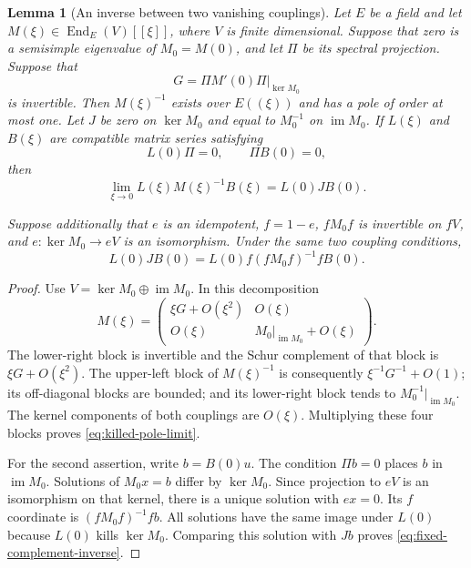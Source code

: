 \documentclass[11pt]{article}
\newtheorem{lemma}[theorem]{Lemma}
\theoremstyle{definition}
\theoremstyle{remark}
\numberwithin{equation}{section}
\begin{document}
\begin{lemma}[An inverse between two vanishing couplings]
\label{lem:killed-pole}
Let $E$ be a field and let $M(\xi)\in\operatorname{End}_E(V)[[\xi]]$, where
$V$ is finite dimensional.  Suppose that zero is a semisimple eigenvalue of
$M_0=M(0)$, and let $\Pi$ be its spectral projection.  Suppose that
\[
 G=\Pi M'(0)\Pi\big|_{\ker M_0}
\]
is invertible.  Then $M(\xi)^{-1}$ exists over $E((\xi))$ and has a pole of
order at most one.  Let $J$ be zero on $\ker M_0$ and equal to $M_0^{-1}$ on
$\operatorname{im}M_0$.  If $L(\xi)$ and $B(\xi)$ are compatible matrix
series satisfying
\[
 L(0)\Pi=0,\qquad \Pi B(0)=0,
\]
then
\begin{equation}
\label{eq:killed-pole-limit}
 \lim_{\xi\to0}L(\xi)M(\xi)^{-1}B(\xi)=L(0)JB(0).
\end{equation}

Suppose additionally that $e$ is an idempotent, $f=1-e$,
$fM_0f$ is invertible on $fV$, and $e:\ker M_0\to eV$ is an isomorphism.
Under the same two coupling conditions,
\begin{equation}
\label{eq:fixed-complement-inverse}
 L(0)JB(0)=L(0)f(fM_0f)^{-1}fB(0).
\end{equation}
\end{lemma}

\begin{proof}
Use $V=\ker M_0\oplus\operatorname{im}M_0$.  In this decomposition
\[
 M(\xi)=
 \begin{pmatrix}
  \xi G+O(\xi^2)&O(\xi)\\
  O(\xi)&M_0|_{\operatorname{im}M_0}+O(\xi)
 \end{pmatrix}.
\]
The lower-right block is invertible and the Schur complement of that block
is $\xi G+O(\xi^2)$.  The upper-left block of $M(\xi)^{-1}$ is consequently
$\xi^{-1}G^{-1}+O(1)$; its off-diagonal blocks are bounded; and its
lower-right block tends to $M_0^{-1}|_{\operatorname{im}M_0}$.
The kernel components of both couplings are $O(\xi)$.  Multiplying these
four blocks proves \eqref{eq:killed-pole-limit}.

For the second assertion, write $b=B(0)u$.  The condition $\Pi b=0$ places
$b$ in $\operatorname{im}M_0$.  Solutions of $M_0x=b$ differ by
$\ker M_0$.  Since projection to $eV$ is an isomorphism on that kernel,
there is a unique solution with $ex=0$.  Its $f$ coordinate is
$(fM_0f)^{-1}fb$.  All solutions have the same image under $L(0)$ because
$L(0)$ kills $\ker M_0$.  Comparing this solution with $Jb$ proves
\eqref{eq:fixed-complement-inverse}.
\end{proof}
\end{document}
